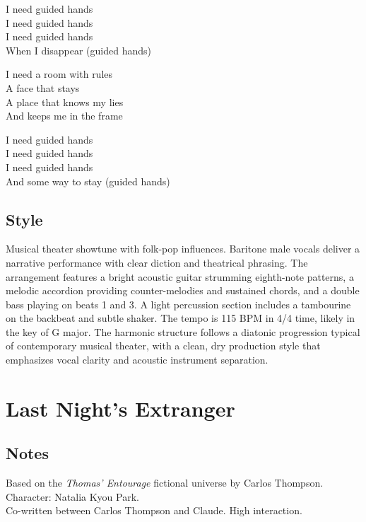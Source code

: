 I need guided hands\\
I need guided hands\\
I need guided hands\\
When I disappear (guided hands)

I need a room with rules\\
A face that stays\\
A place that knows my lies\\
And keeps me in the frame

I need guided hands\\
I need guided hands\\
I need guided hands\\
And some way to stay (guided hands)

\subsection{Style}
Musical theater showtune with folk-pop influences. Baritone male vocals deliver a narrative performance with clear diction and theatrical phrasing. The arrangement features a bright acoustic guitar strumming eighth-note patterns, a melodic accordion providing counter-melodies and sustained chords, and a double bass playing on beats 1 and 3. A light percussion section includes a tambourine on the backbeat and subtle shaker. The tempo is 115 BPM in 4/4 time, likely in the key of G major. The harmonic structure follows a diatonic progression typical of contemporary musical theater, with a clean, dry production style that emphasizes vocal clarity and acoustic instrument separation.

\begin{lyrics}
\end{lyrics}

\section{Last Night's Extranger}

\subsection{Notes}
Based on the \emph{Thomas' Entourage} fictional universe by Carlos Thompson.\\
Character: Natalia Kyou Park.\\
Co-written between Carlos Thompson and Claude. High interaction.

